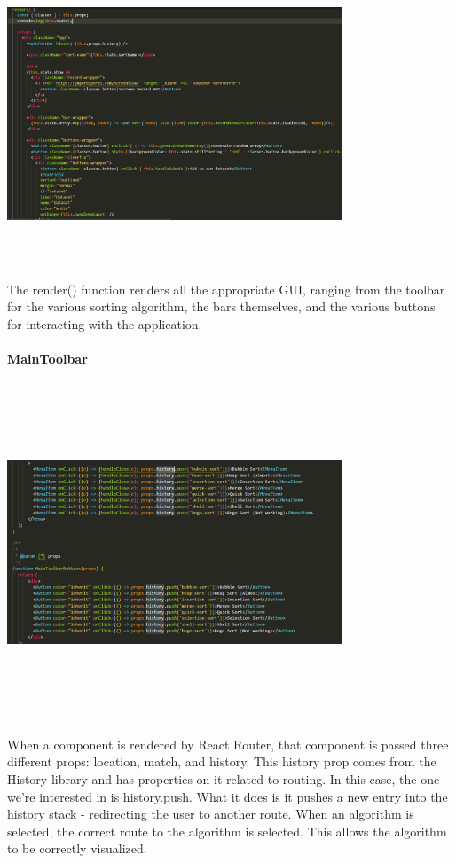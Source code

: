 \begin{center}
    \includegraphics[width=10cm,height=9cm,keepaspectratio]{images/mainpage7}
\end{center}
The render() function renders all the appropriate GUI, ranging from the toolbar for the various sorting algorithm, the bars themselves, and the various buttons for interacting with the application.

\paragraph{MainToolbar}
\begin{center}
    \includegraphics[width=10cm,height=10cm,keepaspectratio]{images/toolbar}
\end{center}
When a component is rendered by React Router, that component is passed three different props: location, match, and history. This history prop comes from the History library and has properties on it related to routing. In this case, the one we’re interested in is history.push. What it does is it pushes a new entry into the history stack - redirecting the user to another route. When an algorithm is selected, the correct route to the algorithm is selected. This allows the algorithm to be correctly visualized.

